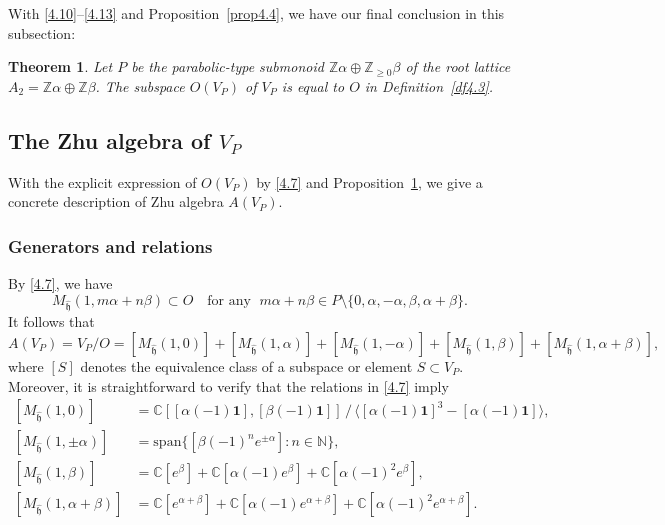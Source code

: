 \documentclass[12pt,a4paper,reqno]{amsart}
\numberwithin{equation}{section}
\numberwithin{equation}{section}
\newtheorem{thm}{Theorem}[section]
\theoremstyle{definition}
\newcommand{\N}{\mathbb{N}}
\newcommand{\Z}{\mathbb{Z}}
\def \C {\mathbb{C}}
\def \al{\alpha}
\def \b {\beta}
\def \op {\oplus}
\def \vac {\mathbf{1}}
\def \h {\mathfrak{h}}
\def\spn{\mathrm{span}}
\def\<{\langle}
\def\>{\rangle}
\begin{document}
	With \eqref{4.10}--\eqref{4.13} and Proposition~\ref{prop4.4}, we have our final conclusion in this subsection:
	
	\begin{thm}\label{prop4.7}
		Let $P$ be the parabolic-type submonoid $\Z\al\op \Z_{\geq 0}\b$ of the root lattice $A_2=\Z\al\op \Z\b$. The subspace $O(V_P)$ of $V_P$ is equal to $O$ in Definition~\ref{df4.3}. 
	\end{thm}
	
	
	\subsection{The Zhu algebra of $V_{P}$}\label{Sec:8.2}
	With the explicit expression of $O(V_P)$ by \eqref{4.7} and Proposition~\ref{prop4.7}, we give a concrete description of Zhu algebra $A(V_P)$.
	
	
	\subsubsection{Generators and relations}By \eqref{4.7}, we have 
	\[
	M_{\hat{\h}}(1,m\alpha+n\beta)\subset O 
	\quad \text{for any } \; m\alpha+n\beta\in P\setminus\{0,\alpha,-\alpha,\beta,\alpha+\beta\}.
	\]
	It follows that 
	\[
	A(V_P)=V_P/O
	=[M_{\hat{\h}}(1,0)]+[M_{\hat{\h}}(1,\alpha)]+[M_{\hat{\h}}(1,-\alpha)]
	+[M_{\hat{\h}}(1,\beta)]+[M_{\hat{\h}}(1,\alpha+\beta)],
	\]
	where $[S]$ denotes the equivalence class of a subspace or element $S\subset V_P$. 
	Moreover, it is straightforward to verify that the relations in \eqref{4.7} imply 
	\begin{equation}\label{4.20}
		\begin{aligned}
			[M_{\hat{\h}}(1,0)]
			&=\C[[\alpha(-1)\vac],[\beta(-1)\vac]]\,\big/\,\<[\alpha(-1)\vac]^3-[\alpha(-1)\vac]\>,\\
			[M_{\hat{\h}}(1,\pm\alpha)]
			&=\spn\{[\beta(-1)^n e^{\pm\alpha}]: n\in \N\},\\
			[M_{\hat{\h}}(1,\beta)]
			&=\C[e^\beta]+\C[\alpha(-1)e^\beta]+\C[\alpha(-1)^2e^\beta],\\
			[M_{\hat{\h}}(1,\alpha+\beta)]
			&=\C[e^{\alpha+\beta}]+\C[\alpha(-1)e^{\alpha+\beta}]+\C[\alpha(-1)^2e^{\alpha+\beta}].
		\end{aligned}
	\end{equation}
	
\end{document}
